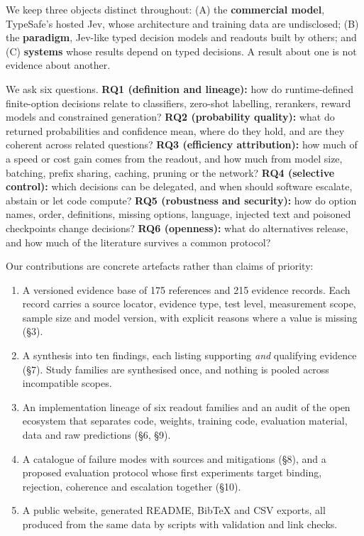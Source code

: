 We keep three objects distinct throughout: (A) the \textbf{commercial model}, TypeSafe's hosted Jev, whose architecture and training data are undisclosed; (B) the \textbf{paradigm}, Jev-like typed decision models and readouts built by others; and (C) \textbf{systems} whose results depend on typed decisions. A result about one is not evidence about another.

We ask six questions. \textbf{RQ1 (definition and lineage):} how do runtime-defined finite-option decisions relate to classifiers, zero-shot labelling, rerankers, reward models and constrained generation? \textbf{RQ2 (probability quality):} what do returned probabilities and confidence mean, where do they hold, and are they coherent across related questions? \textbf{RQ3 (efficiency attribution):} how much of a speed or cost gain comes from the readout, and how much from model size, batching, prefix sharing, caching, pruning or the network? \textbf{RQ4 (selective control):} which decisions can be delegated, and when should software escalate, abstain or let code compute? \textbf{RQ5 (robustness and security):} how do option names, order, definitions, missing options, language, injected text and poisoned checkpoints change decisions? \textbf{RQ6 (openness):} what do alternatives release, and how much of the literature survives a common protocol?

Our contributions are concrete artefacts rather than claims of priority:

\begin{enumerate}[leftmargin=*,itemsep=2pt]
  \item A versioned evidence base of 175 references and 215 evidence records. Each record carries a source locator, evidence type, test level, measurement scope, sample size and model version, with explicit reasons where a value is missing (§3).
  \item A synthesis into ten findings, each listing supporting \emph{and} qualifying evidence (§7). Study families are synthesised once, and nothing is pooled across incompatible scopes.
  \item An implementation lineage of six readout families and an audit of the open ecosystem that separates code, weights, training code, evaluation material, data and raw predictions (§6, §9).
  \item A catalogue of failure modes with sources and mitigations (§8), and a proposed evaluation protocol whose first experiments target binding, rejection, coherence and escalation together (§10).
  \item A public website, generated README, BibTeX and CSV exports, all produced from the same data by scripts with validation and link checks.
\end{enumerate}

